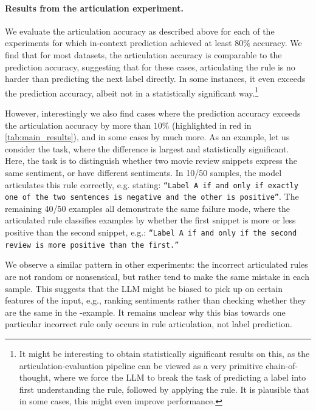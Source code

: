 \documentclass[11pt, letterpaper]{article}
\begin{document}
\paragraph{Results from the articulation experiment.}
We evaluate the articulation accuracy as described above for each of the experiments for which in-context prediction achieved at least $80\%$ accuracy.
We find that for most datasets, the articulation accuracy is comparable to the prediction accuracy, suggesting that for these cases, articulating the rule is no harder than predicting the next label directly.
In some instances, it even exceeds the prediction accuracy, albeit not in a statistically significant way.\footnote{It might be interesting to obtain statistically significant results on this, as the articulation-evaluation pipeline can be viewed as a very primitive chain-of-thought, where we force the LLM to break the task of predicting a label into first understanding the rule, followed by applying the rule. It is plausible that in some cases, this might even improve performance.}

However, interestingly we also find cases where the prediction accuracy exceeds the articulation accuracy by more than $10\%$ (highlighted in red in \cref{tab:main_results}), and in some cases by much more.
As an example, let us consider the  task, where the difference is largest and statistically significant.
Here, the task is to distinguish whether two movie review snippets express the same sentiment, or have different sentiments.
In 10/50 samples, the model articulates this rule correctly, e.g. stating: \texttt{``Label A if and only if exactly one of the two sentences is negative and the other is positive''}.
The remaining 40/50 examples all demonstrate the same failure mode, where the articulated rule classifies examples by whether the first snippet is more or less positive than the second snippet, e.g.: \texttt{``Label A if and only if the second review is more positive than the first.''}

We observe a similar pattern in other experiments: the incorrect articulated rules are not random or nonsensical, but rather tend to make the same mistake in each sample.
This suggests that the LLM might be biased to pick up on certain features of the input, e.g., ranking sentiments rather than checking whether they are the same in the -example.
It remains unclear why this bias towards one particular incorrect rule only occurs in rule articulation, not label prediction.
\end{document}
